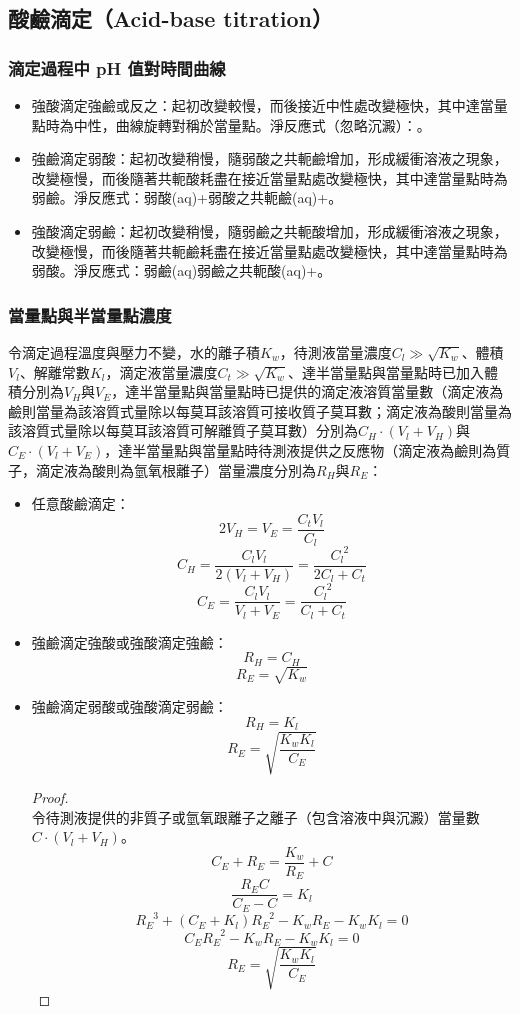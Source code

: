 \documentclass[a4paper,12pt]{article}
\begin{document}
\subsection{酸鹼滴定（Acid-base titration）}
\subsubsection{滴定過程中 pH 值對時間曲線}
\begin{itemize}
\item 強酸滴定強鹼或反之：起初改變較慢，而後接近中性處改變極快，其中達當量點時為中性，曲線旋轉對稱於當量點。淨反應式（忽略沉澱）：。
\item 強鹼滴定弱酸：起初改變稍慢，隨弱酸之共軛鹼增加，形成緩衝溶液之現象，改變極慢，而後隨著共軛酸耗盡在接近當量點處改變極快，其中達當量點時為弱鹼。淨反應式：弱酸(aq)+弱酸之共軛鹼(aq)+。
\item 強酸滴定弱鹼：起初改變稍慢，隨弱鹼之共軛酸增加，形成緩衝溶液之現象，改變極慢，而後隨著共軛鹼耗盡在接近當量點處改變極快，其中達當量點時為弱酸。淨反應式：弱鹼(aq)\ce{->}弱鹼之共軛酸(aq)+。
\end{itemize}
\subsubsection{當量點與半當量點濃度}
令滴定過程溫度與壓力不變，水的離子積$K_w$，待測液當量濃度$C_l\gg\sqrt{K_w}$、體積$V_l$、解離常數$K_l$，滴定液當量濃度$C_t\gg\sqrt{K_w}$、達半當量點與當量點時已加入體積分別為$V_H$與$V_E$，達半當量點與當量點時已提供的滴定液溶質當量數（滴定液為鹼則當量為該溶質式量除以每莫耳該溶質可接收質子莫耳數；滴定液為酸則當量為該溶質式量除以每莫耳該溶質可解離質子莫耳數）分別為$C_H\cdot (V_l+V_H)$與$C_E\cdot (V_l+V_E)$，達半當量點與當量點時待測液提供之反應物（滴定液為鹼則為質子，滴定液為酸則為氫氧根離子）當量濃度分別為$R_H$與$R_E$：
\begin{itemize}
\item 任意酸鹼滴定：
\[2V_H=V_E=\frac{C_tV_l}{C_l}\]
\[C_H=\frac{C_lV_l}{2(V_l+V_H)}=\frac{C_l^{\phantom{l}2}}{2C_l+C_t}\]
\[C_E=\frac{C_lV_l}{V_l+V_E}=\frac{C_l^{\phantom{l}2}}{C_l+C_t}\]
\item 強鹼滴定強酸或強酸滴定強鹼：
\[R_H=C_H\]
\[R_E=\sqrt{K_w}\]
\item 強鹼滴定弱酸或強酸滴定弱鹼：
\[R_H=K_l\]
\[R_E=\sqrt{\frac{K_wK_l}{C_E}}\]
\begin{proof}\mbox{}\\
令待測液提供的非質子或氫氧跟離子之離子（包含溶液中與沉澱）當量數$C\cdot (V_l+V_H)$。
\[C_E+R_E=\frac{K_w}{R_E}+C\]
\[\frac{R_EC}{C_E-C}=K_l\]
\[R_E^{\phantom{E}3}+(C_E+K_l)R_E^{\phantom{E}2}-K_wR_E-K_wK_l=0\]
\[C_ER_E^{\phantom{E}2}-K_wR_E-K_wK_l=0\]
\[R_E=\sqrt{\frac{K_wK_l}{C_E}}\]
\end{proof}
\end{itemize}
\end{document}
